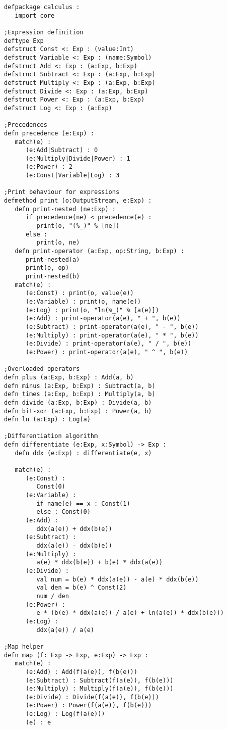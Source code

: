 \documentclass[10pt,oneside]{book}
\begin{document}
\begin{lstlisting}
defpackage calculus :
   import core

;Expression definition
deftype Exp
defstruct Const <: Exp : (value:Int)
defstruct Variable <: Exp : (name:Symbol)
defstruct Add <: Exp : (a:Exp, b:Exp)
defstruct Subtract <: Exp : (a:Exp, b:Exp)
defstruct Multiply <: Exp : (a:Exp, b:Exp)
defstruct Divide <: Exp : (a:Exp, b:Exp)
defstruct Power <: Exp : (a:Exp, b:Exp)
defstruct Log <: Exp : (a:Exp)

;Precedences
defn precedence (e:Exp) :
   match(e) :
      (e:Add|Subtract) : 0
      (e:Multiply|Divide|Power) : 1
      (e:Power) : 2
      (e:Const|Variable|Log) : 3

;Print behaviour for expressions
defmethod print (o:OutputStream, e:Exp) :
   defn print-nested (ne:Exp) :
      if precedence(ne) < precedence(e) :
         print(o, "(%_)" % [ne])
      else :
         print(o, ne)
   defn print-operator (a:Exp, op:String, b:Exp) :
      print-nested(a)
      print(o, op)
      print-nested(b)
   match(e) :
      (e:Const) : print(o, value(e))
      (e:Variable) : print(o, name(e))
      (e:Log) : print(o, "ln(%_)" % [a(e)])
      (e:Add) : print-operator(a(e), " + ", b(e))
      (e:Subtract) : print-operator(a(e), " - ", b(e))
      (e:Multiply) : print-operator(a(e), " * ", b(e))
      (e:Divide) : print-operator(a(e), " / ", b(e))
      (e:Power) : print-operator(a(e), " ^ ", b(e))

;Overloaded operators
defn plus (a:Exp, b:Exp) : Add(a, b)
defn minus (a:Exp, b:Exp) : Subtract(a, b)
defn times (a:Exp, b:Exp) : Multiply(a, b)
defn divide (a:Exp, b:Exp) : Divide(a, b)
defn bit-xor (a:Exp, b:Exp) : Power(a, b)
defn ln (a:Exp) : Log(a)

;Differentiation algorithm
defn differentiate (e:Exp, x:Symbol) -> Exp :
   defn ddx (e:Exp) : differentiate(e, x)
   
   match(e) :
      (e:Const) :
         Const(0)
      (e:Variable) :
         if name(e) == x : Const(1)
         else : Const(0)
      (e:Add) :
         ddx(a(e)) + ddx(b(e))
      (e:Subtract) :
         ddx(a(e)) - ddx(b(e))
      (e:Multiply) :
         a(e) * ddx(b(e)) + b(e) * ddx(a(e))
      (e:Divide) :
         val num = b(e) * ddx(a(e)) - a(e) * ddx(b(e))
         val den = b(e) ^ Const(2)
         num / den
      (e:Power) :
         e * (b(e) * ddx(a(e)) / a(e) + ln(a(e)) * ddx(b(e)))
      (e:Log) :
         ddx(a(e)) / a(e)

;Map helper
defn map (f: Exp -> Exp, e:Exp) -> Exp :
   match(e) :
      (e:Add) : Add(f(a(e)), f(b(e)))
      (e:Subtract) : Subtract(f(a(e)), f(b(e)))
      (e:Multiply) : Multiply(f(a(e)), f(b(e)))
      (e:Divide) : Divide(f(a(e)), f(b(e)))
      (e:Power) : Power(f(a(e)), f(b(e)))
      (e:Log) : Log(f(a(e)))
      (e) : e


\end{lstlisting}
\end{document}
